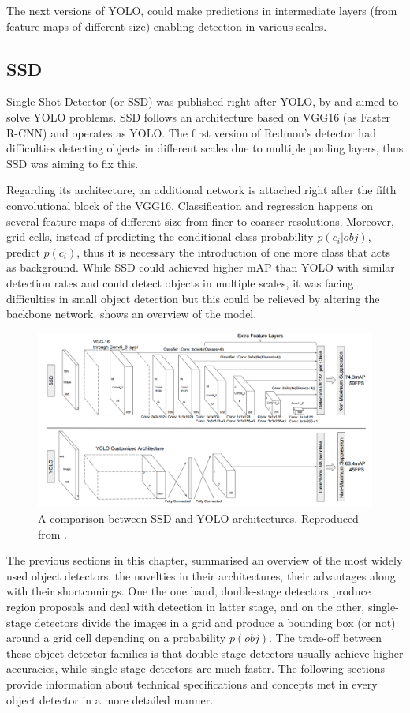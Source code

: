 The next versions of YOLO, could make predictions in intermediate layers (from feature maps of different size) enabling detection in various scales. 
 
\subsection{SSD}
Single Shot Detector (or SSD) was published right after YOLO, by \cite{liu2016ssd} and aimed to solve YOLO problems. SSD follows an architecture based on VGG16 (as Faster R-CNN) and operates as YOLO. The first version of Redmon's detector had difficulties detecting objects in different scales due to multiple pooling layers, thus SSD was aiming to fix this. 

Regarding its architecture, an additional network is attached right after the fifth convolutional block of the VGG16. Classification and regression happens on several feature maps of different size from finer to coarser resolutions. Moreover, grid cells, instead of predicting the conditional class probability $p(c_i|obj)$, predict $p(c_i)$, thus it is necessary the introduction of one more class that acts as background. While SSD could achieved higher mAP than YOLO with similar detection rates and could detect objects in multiple scales, it was facing difficulties in small object detection but this could be relieved by altering the backbone network.   shows an overview of the model.
 
\begin{figure}[!htb]
  \centering
  \includegraphics[width=12cm]{../figures/ch2/fig6.png}
  \caption{A comparison between SSD and YOLO architectures. Reproduced from \cite{liu2016ssd}.}
  \label{fig6}
\end{figure} 
 
The previous sections in this chapter, summarised an overview of the most widely used object detectors, the novelties in their architectures, their advantages along with their shortcomings. One the one hand, double-stage detectors produce region proposals and deal with detection in latter stage, and on the other, single-stage detectors divide the images in a grid and produce a bounding box (or not) around a grid cell depending on a probability $p(obj)$. The trade-off between these object detector families is that double-stage detectors usually achieve higher accuracies, while single-stage detectors are much faster. The following sections provide information about technical specifications and concepts met in every object detector in a more detailed manner.

